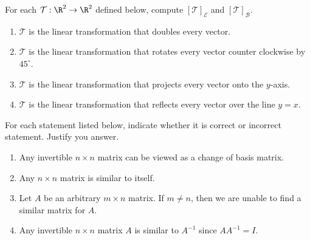 \begin{exercises}
\begin{problist}
	    For each $\mathcal T:\R^2\to\R^2$ defined below, compute $[\mathcal T]_{\mathcal E}$ and $[\mathcal T]_{\mathcal B}$.
	        \begin{enumerate}
	            \item   $\mathcal T$ is the linear transformation that doubles every vector.
			    \item   $\mathcal T$ is the linear transformation that rotates every vector counter clockwise by $45^\circ$.
			    \item   $\mathcal T$ is the linear transformation that projects every vector onto the $y$-axis.
			    \item   $\mathcal T$ is the linear transformation that reflects every vector over the line $y=x$.
	        \end{enumerate}
        
        \prob For each statement listed below, indicate whether it is correct or incorrect statement. Justify you answer.
        \begin{enumerate}
            \item   Any invertible $n \times n$ matrix can be viewed as a change of basis matrix.
            \item   Any $n \times n$ matrix is similar to itself.
            \item   Let $A$ be an arbitrary $m \times n$ matrix. If $m \neq n$, then we are unable to find a similar matrix for $A$.
            \item   Any invertible $n \times n$ matrix $A$ is similar to $A^{-1}$ since $AA^{-1}=I$.
        \end{enumerate}
	\end{problist}
\end{exercises}
